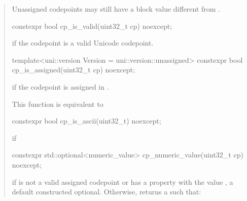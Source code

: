 \documentclass{wg21}
\begin{document}
\begin{quote}
\begin{itemdescr}
\begin{note}
Unassigned codepoints may still have a block value different from .
\end{note}


\end{itemdescr}


\begin{itemdecl}
constexpr bool cp_is_valid(uint32_t cp) noexcept;
\end{itemdecl}

\begin{itemdescr}

\returns {} if the codepoint  is a valid Unicode codepoint.

\end{itemdescr}

\begin{itemdecl}
template<uni::version Version = uni::version::unassigned>
constexpr bool cp_is_assigned(uint32_t cp) noexcept;
\end{itemdecl}

\begin{itemdescr}

\returns {} if the codepoint  is assigned in .

\begin{note}
This function is equivalent to 
\end{note}

\end{itemdescr}

\begin{itemdecl}
constexpr bool cp_is_ascii(uint32_t) noexcept;
\end{itemdecl}

\begin{itemdescr}

\returns {} if 

\end{itemdescr}


\begin{itemdecl}
constexpr std::optional<numeric_value>
cp_numeric_value(uint32_t cp) noexcept;
\end{itemdecl}

\begin{itemdescr}

\returns if  is not a valid assigned codepoint or has a  property with the value , a default constructed optional.
Otherwise, returns a  such that:


\end{itemdescr}
\end{quote}
\end{document}
